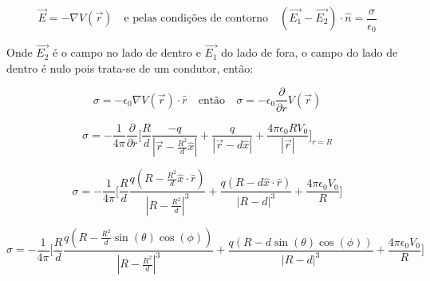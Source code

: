 \documentclass[a4paper,11pt]{exam}
\begin{document}
{	\[\vec{E} = - \nabla V(\vec{r}) \quad \text{e pelas condições de contorno} \quad (\vec{E_1} - \vec{E_2}) \cdot \hat{n} = \frac{\sigma}{\epsilon_0} \] 
	
	\indent Onde $\vec{E_2}$ é o campo no lado de dentro e $\vec{E_1}$ do lado de fora, o campo do lado de dentro é nulo pois trata-se de um condutor, então:
	
	\[ \sigma  = -\epsilon_0 \nabla V(\vec{r}) \cdot \hat{r} \quad \text{então} \quad \sigma  = -\epsilon_0\frac{\partial}{\partial r}V(\vec{r})\]
	
	\[\sigma = -\frac{1}{ 4 \pi } \frac{\partial }{\partial r}\Bigg[ \frac{R}{d}\frac{-q}{|\vec{r} - \frac{R^2}{d}\hat{x}|} + \frac{q}{|\vec{r} - d\hat{x}|} + \frac{4\pi \epsilon_0 R V_0}{|\vec{r}|} \Bigg]_{r=R}\]
		
	\[\sigma = -\frac{1}{ 4 \pi} \Bigg[ \frac{R}{d}\frac{q(R - \frac{R^2}{d}\hat{x}\cdot\hat{r})}{|R - \frac{R^2}{d}|^3} + \frac{q(R - d\hat{x}\cdot\hat{r})}{|R - d|^3} + \frac{4\pi \epsilon_0 V_0 }{R} \Bigg]\]
		
		
		
	\[\sigma = -\frac{1}{ 4 \pi  } \Bigg[ \frac{R}{d}\frac{q(R - \frac{R^2}{d}\sin(\theta)\cos(\phi))}{|R - \frac{R^2}{d}|^3} + \frac{q(R - d\sin(\theta)\cos(\phi))}{|R - d|^3} + \frac{4\pi \epsilon_0 V_0 }{R} \Bigg]\]
		
}
\end{document}
